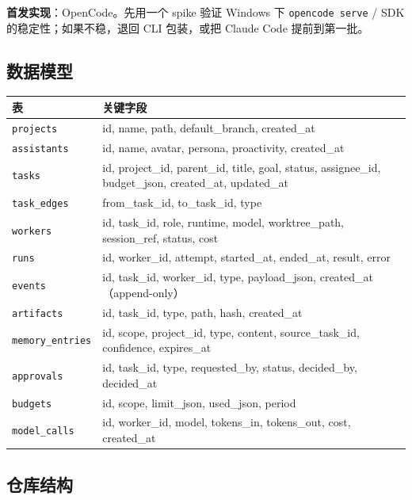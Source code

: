 \documentclass[UTF8,11pt,a4paper,fontset=windows]{ctexart}
\let\ocsubsection\subsection
\renewcommand{\subsection}{\Needspace{5\baselineskip}\ocsubsection}
\newcommand{\code}[1]{\texttt{#1}}
\begin{document}
\textbf{首发实现}：OpenCode。先用一个 spike 验证 Windows 下 \code{opencode serve} / SDK 的稳定性；如果不稳，退回 CLI 包装，或把 Claude Code 提前到第一批。

\subsection{数据模型}

\noindent\begin{minipage}{\linewidth}
\centering
{}
\small
\begin{tabularx}{\linewidth}{@{}p{3.2cm} X@{}}
\toprule
\textbf{表} & \textbf{关键字段} \\
\midrule
\code{projects} & id, name, path, default\_branch, created\_at \\
\code{assistants} & id, name, avatar, persona, proactivity, created\_at \\
\code{tasks} & id, project\_id, parent\_id, title, goal, status, assignee\_id, budget\_json, created\_at, updated\_at \\
\code{task\_edges} & from\_task\_id, to\_task\_id, type \\
\code{workers} & id, task\_id, role, runtime, model, worktree\_path, session\_ref, status, cost \\
\code{runs} & id, worker\_id, attempt, started\_at, ended\_at, result, error \\
\code{events} & id, task\_id, worker\_id, type, payload\_json, created\_at（append-only） \\
\code{artifacts} & id, task\_id, type, path, hash, created\_at \\
\code{memory\_entries} & id, scope, project\_id, type, content, source\_task\_id, confidence, expires\_at \\
\code{approvals} & id, task\_id, type, requested\_by, status, decided\_by, decided\_at \\
\code{budgets} & id, scope, limit\_json, used\_json, period \\
\code{model\_calls} & id, worker\_id, model, tokens\_in, tokens\_out, cost, created\_at \\
\bottomrule
\end{tabularx}
\end{minipage}

\subsection{仓库结构}
\end{document}
